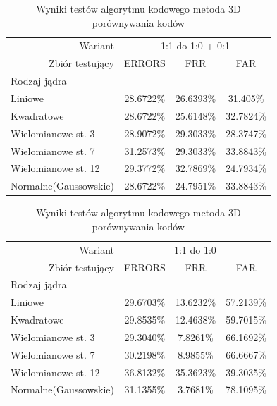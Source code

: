     \begin{table}[!htb]
    \begin{tabular}{p{3cm}|r||c|c|c|}
	\cline{2-5}
    & Wariant & \multicolumn{3}{|c|}{1:1 do 1:0 + 0:1}\\ \cline{2-5} 
    & Zbiór testujący & ERRORS  & FRR & FAR\\ \hline
	\multicolumn{2}{|l||}{Rodzaj jądra} &  \multicolumn{3}{|c|}{}\\
	\hline\hline
    \multicolumn{2}{|l||}{Liniowe} & 28.6722\% & 26.6393\% & 31.405\%\\ \hline
    \multicolumn{2}{|l||}{Kwadratowe} & 28.6722\% & 25.6148\% & 32.7824\%\\ \hline
    \multicolumn{2}{|l||}{Wielomianowe st. 3} & 28.9072\% & 29.3033\% & 28.3747\%\\ \hline
    \multicolumn{2}{|l||}{Wielomianowe st. 7} & 31.2573\% & 29.3033\% & 33.8843\%\\ \hline
    \multicolumn{2}{|l||}{Wielomianowe st. 12} & 29.3772\% & 32.7869\% & 24.7934\%\\ \hline
    \multicolumn{2}{|l||}{Normalne(Gaussowskie)} & 28.6722\% & 24.7951\% & 33.8843\%\\ \hline
    \end{tabular}
	\caption{Wyniki testów algorytmu kodowego metoda 3D porównywania kodów}
	\label{tab:3D_sum}
    \end{table}
    
    \begin{table}[!htb]
    \begin{tabular}{p{3cm}|r||c|c|c|}
	\cline{2-5}
    & Wariant & \multicolumn{3}{|c|}{1:1 do 1:0} \\ \cline{2-5} 
    & Zbiór testujący & ERRORS  & FRR & FAR\\ \hline
	\multicolumn{2}{|l||}{Rodzaj jądra} &  \multicolumn{3}{|c|}{}\\
	\hline\hline
    \multicolumn{2}{|l||}{Liniowe} & 29.6703\% & 13.6232\% & 57.2139\%\\ \hline
    \multicolumn{2}{|l||}{Kwadratowe} & 29.8535\% & 12.4638\% & 59.7015\%\\ \hline
    \multicolumn{2}{|l||}{Wielomianowe st. 3} & 29.3040\% & 7.8261\% & 66.1692\%\\ \hline
    \multicolumn{2}{|l||}{Wielomianowe st. 7} & 30.2198\% & 8.9855\% & 66.6667\%\\ \hline
    \multicolumn{2}{|l||}{Wielomianowe st. 12} & 36.8132\% & 35.3623\% & 39.3035\%\\ \hline
    \multicolumn{2}{|l||}{Normalne(Gaussowskie)} & 31.1355\% & 3.7681\% & 78.1095\%\\ \hline
    \end{tabular}
	\caption{Wyniki testów algorytmu kodowego metoda 3D porównywania kodów}
	\label{tab:3D_pattern}
    \end{table}
    
